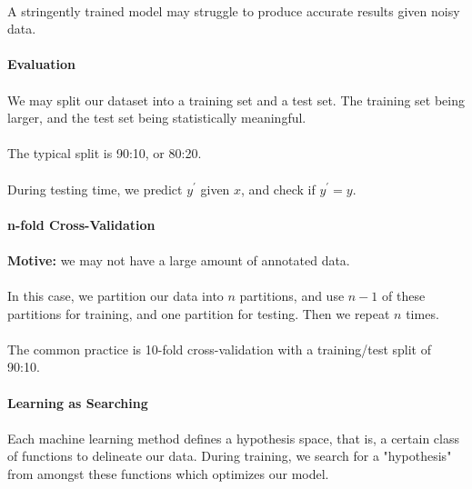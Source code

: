 \documentclass[letterpaper,12pt]{article}
\begin{document}
\paragraph{}A stringently trained model may struggle to produce accurate results given noisy data.
\paragraph{Evaluation}
\paragraph{}We may split our dataset into a training set and a test set. The training set being larger,
and the test set being statistically meaningful. 
\paragraph{}The typical split is 90:10, or 80:20.
\paragraph{}During testing time, we predict $y^\prime$ given $x$, and check if $y^\prime = y$.
\paragraph{n-fold Cross-Validation}
\paragraph{} \textbf{Motive:} we may not have a large amount of annotated data.
\paragraph{}In this case, we partition our data into $n$ partitions, and use $n-1$ of these partitions for 
training, and one partition for testing. Then we repeat $n$ times.
\paragraph{}The common practice is 10-fold cross-validation with a training/test split of 90:10.

\paragraph{Learning as Searching}
\paragraph{}Each machine learning method defines a hypothesis space, that is, a certain class of functions
to delineate our data. During training, we search for a "hypothesis" from amongst these functions
which optimizes our model.
\end{document}
